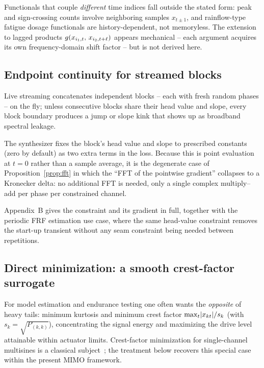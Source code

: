 \documentclass[10pt,a4paper]{article}
\numberwithin{equation}{section}
\DeclarePairedDelimiter\abs{\lvert}{\rvert}
\DeclarePairedDelimiter\mat{(}{)}
\begin{document}
Functionals that couple \emph{different} time indices fall outside the stated form: peak and sign-crossing counts involve neighboring samples $x_{t\pm1}$, and rainflow-type fatigue dosage functionals are history-dependent, not memoryless. The extension to lagged products $g\mat{x_{i_1,t},\,x_{i_2,t+\ell}}$ appears mechanical -- each argument acquires its own frequency-domain shift factor -- but is not derived here.

\subsection*{Endpoint continuity for streamed blocks}

Live streaming concatenates independent blocks -- each with fresh random phases -- on the fly; unless consecutive blocks share their head value and slope, every block boundary produces a jump or slope kink that shows up as broadband spectral leakage. 

The synthesizer fixes the block's head value and slope to prescribed constants (zero by default) as two extra terms in the loss. Because this is point evaluation at $t=0$ rather than a sample average, it is the degenerate case of Proposition~\ref{prop:fft} in which the ``FFT of the pointwise gradient'' collapses to a Kronecker delta: no additional FFT is needed, only a single complex multiply--add per phase per constrained channel. 

Appendix~B gives the constraint and its gradient in full, together with the periodic FRF estimation use case, where the same head-value constraint removes the start-up transient without any seam constraint being needed between repetitions.

\subsection*{Direct minimization: a smooth crest-factor surrogate}

For model estimation and endurance testing one often wants the \emph{opposite} of heavy tails: minimum kurtosis and minimum crest factor $\max_t\abs{x_{k t}}/s_k$ (with $s_k = \sqrt{P_{(k,k)}}$), concentrating the signal energy and maximizing the drive level attainable within actuator limits. Crest-factor minimization for single-channel multisines is a classical subject~\cite{schroeder1970lowpeak,vanderouderaa1988peak,guillaume1991crest,retzler2022crest}; the treatment below recovers this special case within the present MIMO framework. 
\end{document}
